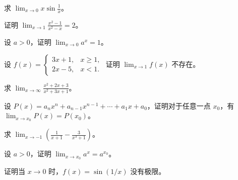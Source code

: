 \noindent\begin{minipage}{\textwidth}
求 $\displaystyle\lim_{x\to0}x\sin\frac1x$。
\end{minipage}\par\vfill
\noindent\begin{minipage}{\textwidth}
证明 $\displaystyle\lim_{x\to1}\frac{x^2-1}{x^2-x}=2$。
\end{minipage}\par\vfill
\noindent\begin{minipage}{\textwidth}
设 $a>0$，证明 $\displaystyle\lim_{x\to0}a^x=1$。
\end{minipage}\par\vfill
\newpage
\noindent\begin{minipage}{\textwidth}
设 $\displaystyle f(x)=\begin{cases}3x+1,&x\ge1,\\2x-5,&x<1.\end{cases}$ 证明 $\displaystyle\lim_{x\to1}f(x)$ 不存在。
\end{minipage}\par\vfill
\noindent\begin{minipage}{\textwidth}
求 $\displaystyle\lim_{x\to\infty}\frac{x^2+2x+3}{x^2+3x+1}$。
\end{minipage}\par\vfill
\noindent\begin{minipage}{\textwidth}
设 $P(x)=a_nx^n+a_{n-1}x^{n-1}+\cdots+a_1x+a_0$，证明对于任意一点 $x_0$，有 $\displaystyle\lim_{x\to x_0}P(x)=P(x_0)$。
\end{minipage}\par\vfill
\noindent\begin{minipage}{\textwidth}
求 $\displaystyle\lim_{x\to-1}\left(\frac1{x+1}-\frac3{x^3+1}\right)$。
\end{minipage}\par\vfill
\newpage
\noindent\begin{minipage}{\textwidth}
设 $a>0$，证明 $\displaystyle\lim_{x\to x_0}a^x=a^{x_0}$。
\end{minipage}\par\vfill
\noindent\begin{minipage}{\textwidth}
证明当 $x\to0$ 时，$f(x)=\sin(1/x)$ 没有极限。
\end{minipage}\par\vfill
